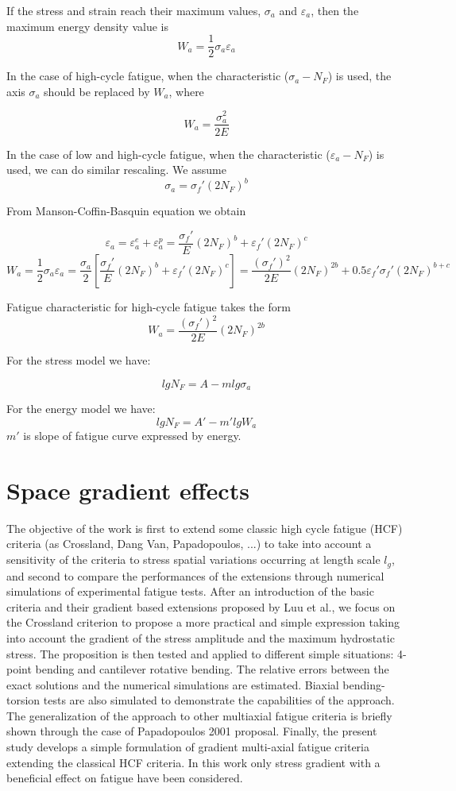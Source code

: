 \documentclass[3p,times,procedia,number]{elsarticle}
\begin{document}
         If the stress and strain reach their maximum values,
         $\sigma_a$ and $\varepsilon_a$, then the maximum energy density value is
         $$W_a=\frac{1}{2}\sigma_a\varepsilon_a$$
         
         In the case of high-cycle fatigue,
         when the characteristic ($\sigma_a-N_F$) is used, the axis $\sigma_a$
         should be replaced by $W_a$, where
         
         $$W_a=\frac{\sigma_a^2}{2E}$$
         
         In the case of low and high-cycle fatigue, when the
         characteristic ($\varepsilon_a-N_F$) is used, we can do similar rescaling. We assume $$\sigma_a=\sigma_f'(2N_F)^b$$
         
         From Manson-Coffin-Basquin equation we obtain
         
         $$\varepsilon_a=\varepsilon_a^e+\varepsilon_a^p=\frac{\sigma_f'}{E}(2N_F)^b+\varepsilon_f'(2N_F)^c$$
         $$W_a=\frac{1}{2}\sigma_a\varepsilon_a=\frac{\sigma_a}{2}\left[\frac{\sigma_f'}{E}(2N_F)^b+\varepsilon_f'(2N_F)^c\right]=\frac{(\sigma_f')^2}{2E}(2N_F)^{2b}+0.5\varepsilon_f'\sigma_f'(2N_F)^{b+c}$$
         
         Fatigue characteristic for high-cycle fatigue
         takes the form
         $$W_a=\frac{(\sigma_f')^2}{2E}(2N_F)^{2b}$$
         
         For the stress model we have:
         
         $$lgN_F=A-mlg\sigma_a$$
         
         For the energy model we have:
         $$lgN_F=A'-m'lgW_a$$
         $m'$ is slope of fatigue curve
         expressed by energy.
         
         
\section{Space gradient effects}
The objective of the work is first to extend some classic high cycle fatigue (HCF) criteria (as Crossland, Dang Van, Papadopoulos, ...) to take into account a sensitivity of the criteria to stress spatial variations occurring at length scale $l_g$, and second to compare the performances of the extensions through numerical simulations of experimental fatigue tests. After an introduction of the basic criteria and their gradient based extensions proposed by Luu et al., we focus on the Crossland criterion to propose a more practical and simple expression taking into account the gradient of the stress amplitude and the maximum hydrostatic stress. The proposition is then tested and applied to different simple situations: 4-point bending and cantilever rotative bending.  The relative errors between the exact solutions and the numerical simulations are estimated. Biaxial  bending-torsion tests are also simulated to demonstrate the capabilities of the approach. The generalization of the approach to other multiaxial fatigue criteria is briefly shown through the case of Papadopoulos 2001 proposal. Finally, the present study develops a simple formulation of gradient multi-axial fatigue criteria extending the classical HCF criteria. In this work only stress gradient with a beneficial effect on fatigue have been considered.
\end{document}
